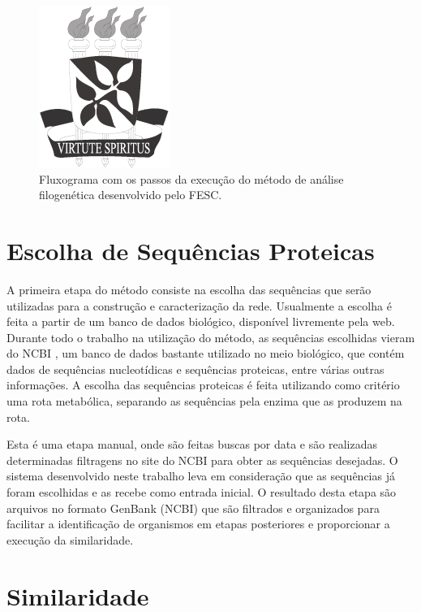 \begin{figure}
\centering
\includegraphics{brasaoUFBA2}
\caption{Fluxograma com os passos da execução do método de análise filogenética desenvolvido pelo FESC.}
\label{fig:fluxograma}
\end{figure}


\section{Escolha de Sequências Proteicas} \label{sec:escseq}

A primeira etapa do método consiste na escolha das sequências que serão utilizadas para a construção e caracterização da rede.
Usualmente a escolha é feita a partir de um banco de dados biológico, disponível livremente pela web. Durante todo o trabalho na utilização
do método, as sequências escolhidas vieram do NCBI \cite{ncbi}, um banco de dados bastante utilizado no meio biológico, que contém dados de sequências
nucleotídicas e sequências proteicas, entre várias outras informações. A escolha das sequências proteicas é feita utilizando como critério
uma rota metabólica, separando as sequências pela enzima que as produzem na rota.


Esta é uma etapa manual, onde são feitas buscas por data e são realizadas determinadas filtragens no site do NCBI para obter as sequências desejadas. O
sistema desenvolvido neste trabalho leva em consideração que as sequências já foram escolhidas e as recebe como entrada inicial. O resultado desta etapa
são arquivos no formato GenBank (NCBI) que são filtrados e organizados para facilitar a identificação de organismos em etapas posteriores e proporcionar
a execução da similaridade.

\section{Similaridade} \label{sec:similaridade}

